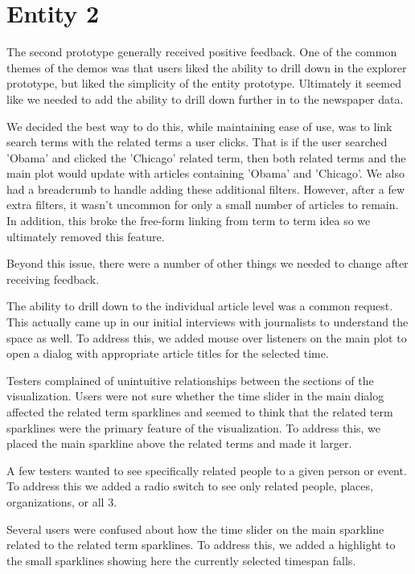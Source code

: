 \section{Entity 2}
The second prototype generally received positive feedback. One of the common themes of the demos was that users liked the ability to drill down in the explorer prototype, but liked the simplicity of the entity prototype. Ultimately it seemed like we needed to add the ability to drill down further in to the newspaper data.

We decided the best way to do this, while maintaining ease of use, was to link search terms with the related terms a user clicks. That is if the user searched 'Obama' and clicked the 'Chicago' related term, then both related terms and the main plot would update with articles containing 'Obama' and 'Chicago'. We also had a breadcrumb to handle adding these additional filters. However, after a few extra filters, it wasn't uncommon for only a small number of articles to remain. In addition, this broke the free-form linking from term to term idea so we ultimately removed this feature.

Beyond this issue, there were a number of other things we needed to change after receiving feedback.

The ability to drill down to the individual article level was a common request. This actually came up in our initial interviews with journalists to understand the space as well. To address this, we added mouse over listeners on the main plot to open a dialog with appropriate article titles for the selected time.

Testers complained of unintuitive relationships between the sections of the visualization. Users were not sure whether the time slider in the main dialog affected the related term sparklines and seemed to think that the related term sparklines were the primary feature of the visualization. To address this, we placed the main sparkline above the related terms and made it larger.

A few testers wanted to see specifically related people to a given person or event. To address this we added a radio switch to see only related people, places, organizations, or all 3.

Several users were confused about how the time slider on the main sparkline related to the related term sparklines. To address this, we added a highlight to the small sparklines showing here the currently selected timespan falls. 

